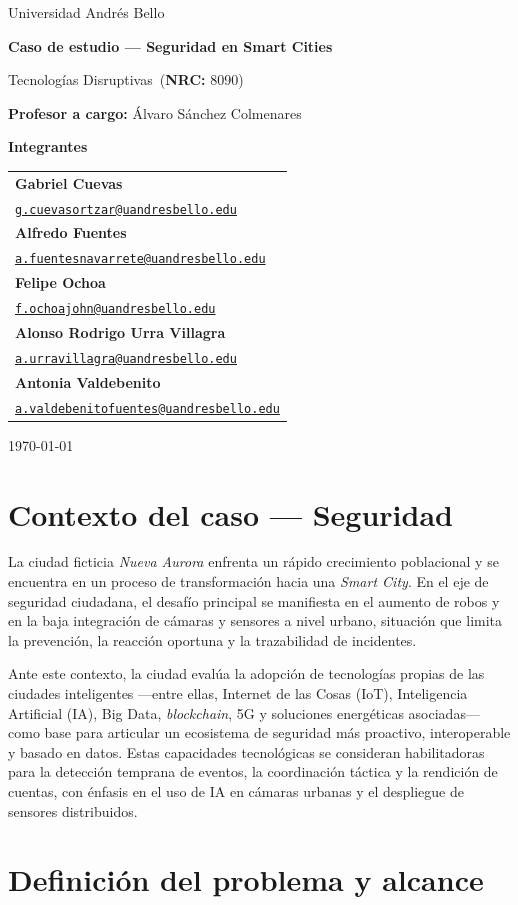 \documentclass[12pt,a4paper]{article}
\makeatletter
\newcommand{\Universidad}{Universidad Andrés Bello}
\newcommand{\Materia}{Tecnologías Disruptivas}
\newcommand{\NRC}{8090}
\newcommand{\Profesor}{Álvaro Sánchez Colmenares}
\newcommand{\NombreCaso}{Caso de estudio — Seguridad en Smart Cities}
\newcommand{\Integrantes}{%
  \begin{tabular}{@{}l}
    \textbf{Gabriel Cuevas}\\[-2pt]
    \texttt{\href{mailto:g.cuevasortzar@uandresbello.edu}{g.cuevasortzar@uandresbello.edu}}\\[6pt]
    \textbf{Alfredo Fuentes}\\[-2pt]
    \texttt{\href{mailto:a.fuentesnavarrete@uandresbello.edu}{a.fuentesnavarrete@uandresbello.edu}}\\[6pt]
    \textbf{Felipe Ochoa}\\[-2pt]
    \texttt{\href{mailto:f.ochoajohn@uandresbello.edu}{f.ochoajohn@uandresbello.edu}}\\[6pt]
    \textbf{Alonso Rodrigo Urra Villagra}\\[-2pt]
    \texttt{\href{mailto:a.urravillagra@uandresbello.edu}{a.urravillagra@uandresbello.edu}}\\[6pt]
    \textbf{Antonia Valdebenito}\\[-2pt]
    \texttt{\href{mailto:a.valdebenitofuentes@uandresbello.edu}{a.valdebenitofuentes@uandresbello.edu}}
  \end{tabular}
}
\newcommand{\Fecha}{\today}
\makeatother
\begin{document}
\begin{titlepage}
  \centering
  \vspace*{1cm}
  {\Large \Universidad\par}
  \vspace{3cm}
  {\LARGE\bfseries \NombreCaso\par}
  \vspace{1.5cm}
  {\large \Materia\ (\textbf{NRC:} \NRC)\par}
  \vspace{0.4cm}
  {\large \textbf{Profesor a cargo:} \Profesor\par}
  \vspace{2.2cm}
  {\large \textbf{Integrantes}\par}
  \vspace{0.3cm}
  {\large \Integrantes\par}
  \vfill
  {\large \Fecha\par}
\end{titlepage}

\clearpage
{}
\justifying

\section*{Contexto del caso — Seguridad}

La ciudad ficticia \textit{Nueva Aurora} enfrenta un rápido crecimiento poblacional y se encuentra en un proceso de transformación hacia una \textit{Smart City}. En el eje de seguridad ciudadana, el desafío principal se manifiesta en el aumento de robos y en la baja integración de cámaras y sensores a nivel urbano, situación que limita la prevención, la reacción oportuna y la trazabilidad de incidentes.

Ante este contexto, la ciudad evalúa la adopción de tecnologías propias de las ciudades inteligentes —entre ellas, Internet de las Cosas (IoT), Inteligencia Artificial (IA), Big Data, \textit{blockchain}, 5G y soluciones energéticas asociadas— como base para articular un ecosistema de seguridad más proactivo, interoperable y basado en datos. Estas capacidades tecnológicas se consideran habilitadoras para la detección temprana de eventos, la coordinación táctica y la rendición de cuentas, con énfasis en el uso de IA en cámaras urbanas y el despliegue de sensores distribuidos.

\section{Definición del problema y alcance}
\end{document}
